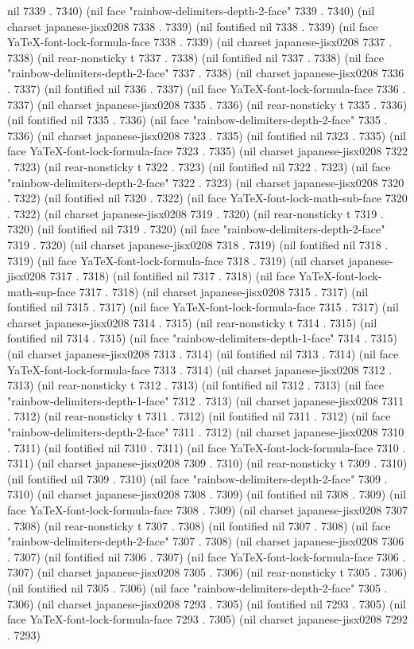 nil 7339 . 7340) (nil face "rainbow-delimiters-depth-2-face" 7339 . 7340) (nil charset japanese-jisx0208 7338 . 7339) (nil fontified nil 7338 . 7339) (nil face YaTeX-font-lock-formula-face 7338 . 7339) (nil charset japanese-jisx0208 7337 . 7338) (nil rear-nonsticky t 7337 . 7338) (nil fontified nil 7337 . 7338) (nil face "rainbow-delimiters-depth-2-face" 7337 . 7338) (nil charset japanese-jisx0208 7336 . 7337) (nil fontified nil 7336 . 7337) (nil face YaTeX-font-lock-formula-face 7336 . 7337) (nil charset japanese-jisx0208 7335 . 7336) (nil rear-nonsticky t 7335 . 7336) (nil fontified nil 7335 . 7336) (nil face "rainbow-delimiters-depth-2-face" 7335 . 7336) (nil charset japanese-jisx0208 7323 . 7335) (nil fontified nil 7323 . 7335) (nil face YaTeX-font-lock-formula-face 7323 . 7335) (nil charset japanese-jisx0208 7322 . 7323) (nil rear-nonsticky t 7322 . 7323) (nil fontified nil 7322 . 7323) (nil face "rainbow-delimiters-depth-2-face" 7322 . 7323) (nil charset japanese-jisx0208 7320 . 7322) (nil fontified nil 7320 . 7322) (nil face YaTeX-font-lock-math-sub-face 7320 . 7322) (nil charset japanese-jisx0208 7319 . 7320) (nil rear-nonsticky t 7319 . 7320) (nil fontified nil 7319 . 7320) (nil face "rainbow-delimiters-depth-2-face" 7319 . 7320) (nil charset japanese-jisx0208 7318 . 7319) (nil fontified nil 7318 . 7319) (nil face YaTeX-font-lock-formula-face 7318 . 7319) (nil charset japanese-jisx0208 7317 . 7318) (nil fontified nil 7317 . 7318) (nil face YaTeX-font-lock-math-sup-face 7317 . 7318) (nil charset japanese-jisx0208 7315 . 7317) (nil fontified nil 7315 . 7317) (nil face YaTeX-font-lock-formula-face 7315 . 7317) (nil charset japanese-jisx0208 7314 . 7315) (nil rear-nonsticky t 7314 . 7315) (nil fontified nil 7314 . 7315) (nil face "rainbow-delimiters-depth-1-face" 7314 . 7315) (nil charset japanese-jisx0208 7313 . 7314) (nil fontified nil 7313 . 7314) (nil face YaTeX-font-lock-formula-face 7313 . 7314) (nil charset japanese-jisx0208 7312 . 7313) (nil rear-nonsticky t 7312 . 7313) (nil fontified nil 7312 . 7313) (nil face "rainbow-delimiters-depth-1-face" 7312 . 7313) (nil charset japanese-jisx0208 7311 . 7312) (nil rear-nonsticky t 7311 . 7312) (nil fontified nil 7311 . 7312) (nil face "rainbow-delimiters-depth-2-face" 7311 . 7312) (nil charset japanese-jisx0208 7310 . 7311) (nil fontified nil 7310 . 7311) (nil face YaTeX-font-lock-formula-face 7310 . 7311) (nil charset japanese-jisx0208 7309 . 7310) (nil rear-nonsticky t 7309 . 7310) (nil fontified nil 7309 . 7310) (nil face "rainbow-delimiters-depth-2-face" 7309 . 7310) (nil charset japanese-jisx0208 7308 . 7309) (nil fontified nil 7308 . 7309) (nil face YaTeX-font-lock-formula-face 7308 . 7309) (nil charset japanese-jisx0208 7307 . 7308) (nil rear-nonsticky t 7307 . 7308) (nil fontified nil 7307 . 7308) (nil face "rainbow-delimiters-depth-2-face" 7307 . 7308) (nil charset japanese-jisx0208 7306 . 7307) (nil fontified nil 7306 . 7307) (nil face YaTeX-font-lock-formula-face 7306 . 7307) (nil charset japanese-jisx0208 7305 . 7306) (nil rear-nonsticky t 7305 . 7306) (nil fontified nil 7305 . 7306) (nil face "rainbow-delimiters-depth-2-face" 7305 . 7306) (nil charset japanese-jisx0208 7293 . 7305) (nil fontified nil 7293 . 7305) (nil face YaTeX-font-lock-formula-face 7293 . 7305) (nil charset japanese-jisx0208 7292 . 7293) 